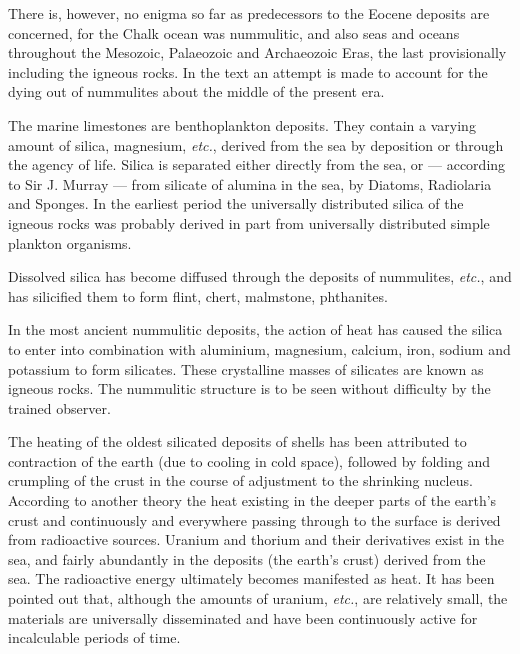 \documentclass[a4paper, 12pt, oneside]{article}
\begin{document}
There is, however, no enigma so far as predecessors to the Eocene deposits are concerned, for the Chalk ocean was nummulitic, and also seas and oceans throughout the Mesozoic, Palaeozoic and Archaeozoic Eras, the last provisionally including the igneous rocks. In the text an attempt is made to account for the dying out of nummulites about the middle of the present era.

The marine limestones are benthoplankton deposits. They contain a varying amount of silica, magnesium, \emph{etc.}, derived from the sea by deposition or through the agency of life. Silica is separated either directly from the sea, or --- according to Sir J. Murray --- from silicate of alumina in the sea, by Diatoms, Radiolaria and Sponges. In the earliest period the universally distributed silica of the igneous rocks was probably derived in part from universally distributed simple plankton organisms.

Dissolved silica has become diffused through the deposits of nummulites, \emph{etc.}, and has silicified them to form flint, chert, malmstone, phthanites.

In the most ancient nummulitic deposits, the action of heat has caused the silica to enter into combination with aluminium, magnesium, calcium, iron, sodium and potassium to form silicates. These crystalline masses of silicates are known as igneous rocks. The nummulitic structure is to be seen without difficulty by the trained observer.

The heating of the oldest silicated deposits of shells has been attributed to contraction of the earth (due to cooling in cold space), followed by folding and crumpling of the crust in the course of adjustment to the shrinking nucleus. According to another theory the heat existing in the deeper parts of the earth's crust and continuously and everywhere passing through to the surface is derived from radioactive sources. Uranium and thorium and their derivatives exist in the sea, and fairly abundantly in the deposits (the earth's crust) derived from the sea. The radioactive energy ultimately becomes manifested as heat. It has been pointed out that, although the amounts of uranium, \emph{etc.}, are relatively small, the materials are universally disseminated and have been continuously active for incalculable periods of time.
\end{document}
